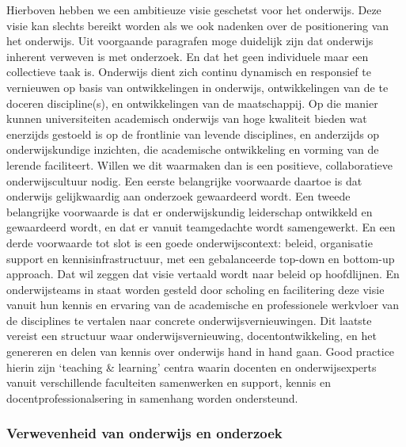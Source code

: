 \documentclass{jote-book}
\begin{document}
	Hierboven hebben we een ambitieuze visie geschetst voor het onderwijs. Deze visie kan slechts bereikt worden als we ook nadenken over de positionering van het onderwijs. Uit voorgaande paragrafen moge duidelijk zijn dat onderwijs inherent verweven is met onderzoek. En dat het geen individuele maar een collectieve taak is. Onderwijs dient zich continu dynamisch en responsief te vernieuwen op basis van ontwikkelingen in onderwijs, ontwikkelingen van de te doceren discipline(s), en ontwikkelingen van de maatschappij. Op die manier kunnen universiteiten academisch onderwijs van hoge kwaliteit bieden wat enerzijds gestoeld is op de frontlinie van levende disciplines, en anderzijds op onderwijskundige inzichten, die academische ontwikkeling en vorming van de lerende faciliteert. Willen we dit waarmaken dan is een positieve, collaboratieve onderwijscultuur nodig. Een eerste belangrijke voorwaarde daartoe is dat onderwijs gelijkwaardig aan onderzoek gewaardeerd wordt. Een tweede belangrijke voorwaarde is dat er onderwijskundig leiderschap ontwikkeld en gewaardeerd wordt, en dat er vanuit teamgedachte wordt samengewerkt. En een derde voorwaarde tot slot is een goede onderwijscontext: beleid, organisatie support en kennisinfrastructuur, met een gebalanceerde top-down en bottom-up approach. Dat wil zeggen dat visie vertaald wordt naar beleid op hoofdlijnen. En onderwijsteams in staat worden gesteld door scholing en facilitering deze visie vanuit hun kennis en ervaring van de academische en professionele werkvloer van de disciplines te vertalen naar concrete onderwijsvernieuwingen. Dit laatste vereist een structuur waar onderwijsvernieuwing, docentontwikkeling, en het genereren en delen van kennis over onderwijs hand in hand gaan. Good practice hierin zijn ‘teaching \& learning' centra waarin docenten en onderwijsexperts vanuit verschillende faculteiten samenwerken en support, kennis en docentprofessionalsering in samenhang worden ondersteund.



	\subsubsection{Verwevenheid van onderwijs en onderzoek}
\end{document}
